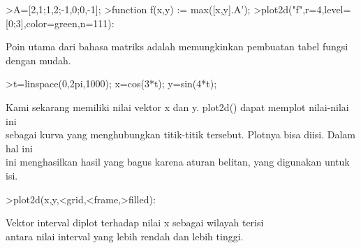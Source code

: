 \documentclass[a4paper,10pt]{article}
\begin{document}
\begin{eulernotebook}
\begin{eulercomment}
\begin{eulercomment}
\begin{eulercomment}
\begin{eulercomment}
\begin{eulercomment}
\begin{eulercomment}
\begin{eulercomment}
\begin{eulercomment}
\begin{eulerprompt}
>A=[2,1;1,2;-1,0;0,-1];
>function f(x,y) := max([x,y].A');
>plot2d("f",r=4,level=[0;3],color=green,n=111):
\end{eulerprompt}
\begin{eulercomment}
Poin utama dari bahasa matriks adalah memungkinkan pembuatan tabel
fungsi dengan mudah.
\end{eulercomment}
\begin{eulerprompt}
>t=linspace(0,2pi,1000); x=cos(3*t); y=sin(4*t);
\end{eulerprompt}
\begin{eulercomment}
Kami sekarang memiliki nilai vektor x dan y. plot2d() dapat memplot
nilai-nilai ini\\
sebagai kurva yang menghubungkan titik-titik tersebut. Plotnya bisa
diisi. Dalam hal ini\\
ini menghasilkan hasil yang bagus karena aturan belitan, yang
digunakan untuk\\
isi.
\end{eulercomment}
\begin{eulerprompt}
>plot2d(x,y,<grid,<frame,>filled):
\end{eulerprompt}
\begin{eulercomment}
Vektor interval diplot terhadap nilai x sebagai wilayah terisi\\
antara nilai interval yang lebih rendah dan lebih tinggi.


\end{eulercomment}
\end{eulercomment}
\end{eulercomment}
\end{eulercomment}
\end{eulercomment}
\end{eulercomment}
\end{eulercomment}
\end{eulercomment}
\end{eulercomment}
\end{eulernotebook}
\end{document}
